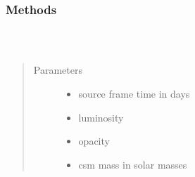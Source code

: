 \documentclass[letterpaper,10pt,english]{sphinxmanual}
\begin{document}
\begin{fulllineitems}
\label{\detokenize{generated/sdapy.interaction_processes.CSMDiffusion:sdapy.interaction_processes.CSMDiffusion}}~\subsubsection*{Methods}


\begin{savenotes}\sphinxattablestart
\centering
\begin{tabulary}{\linewidth}[t]{|T|T|}
\hline

&\\
\hline
\end{tabulary}
\par
\sphinxattableend\end{savenotes}

\begin{fulllineitems}
\label{\detokenize{generated/sdapy.interaction_processes.CSMDiffusion:sdapy.interaction_processes.CSMDiffusion.__init__}}~\begin{quote}\begin{description}
\item[{Parameters}] \leavevmode\begin{itemize}
\item {} 
 \textendash{} source frame time in days

\item {} 
 \textendash{} luminosity

\item {} 
 \textendash{} opacity

\item {} 
 \textendash{} csm mass in solar masses


\end{itemize}
\end{description}
\end{quote}
\end{fulllineitems}
\end{fulllineitems}
\end{document}
